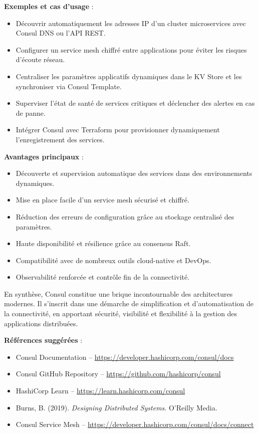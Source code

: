 \textbf{Exemples et cas d’usage} :
\begin{itemize}
	\item Découvrir automatiquement les adresses IP d’un cluster microservices avec Consul DNS ou l’API REST.
	\item Configurer un service mesh chiffré entre applications pour éviter les risques d’écoute réseau.
	\item Centraliser les paramètres applicatifs dynamiques dans le KV Store et les synchroniser via Consul Template.
	\item Superviser l’état de santé de services critiques et déclencher des alertes en cas de panne.
	\item Intégrer Consul avec Terraform pour provisionner dynamiquement l’enregistrement des services.
\end{itemize}

\textbf{Avantages principaux} :
\begin{itemize}
	\item Découverte et supervision automatique des services dans des environnements dynamiques.
	\item Mise en place facile d’un service mesh sécurisé et chiffré.
	\item Réduction des erreurs de configuration grâce au stockage centralisé des paramètres.
	\item Haute disponibilité et résilience grâce au consensus Raft.
	\item Compatibilité avec de nombreux outils cloud-native et DevOps.
	\item Observabilité renforcée et contrôle fin de la connectivité.
\end{itemize}

En synthèse, Consul constitue une brique incontournable des architectures modernes. Il s’inscrit dans une démarche de simplification et d’automatisation de la connectivité, en apportant sécurité, visibilité et flexibilité à la gestion des applications distribuées.

\textbf{Références suggérées} :
\begin{itemize}
	\item Consul Documentation – \url{https://developer.hashicorp.com/consul/docs}
	\item Consul GitHub Repository – \url{https://github.com/hashicorp/consul}
	\item HashiCorp Learn – \url{https://learn.hashicorp.com/consul}
	\item Burns, B. (2019). \textit{Designing Distributed Systems}. O’Reilly Media.
	\item Consul Service Mesh – \url{https://developer.hashicorp.com/consul/docs/connect}
\end{itemize}

